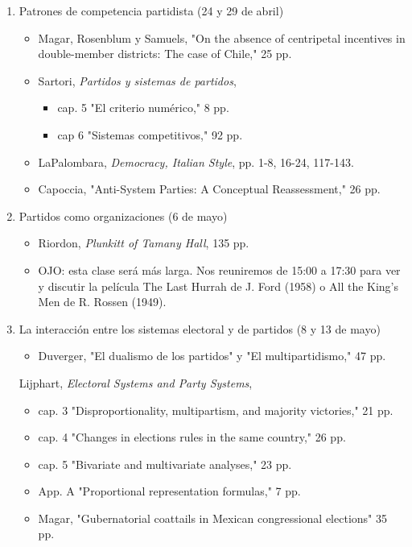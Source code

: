 \documentclass{article}
\begin{document}
\begin{enumerate}
\begin{itemize}
\end{itemize}
\item Patrones de competencia partidista  (24 y 29 de abril)
\label{sec:orgbbc7e78}
\begin{itemize}
\item Magar, Rosenblum y Samuels, "On the absence of centripetal incentives in double-member districts: The case of Chile," 25 pp.
\item Sartori, \emph{Partidos y sistemas de partidos}, 
\begin{itemize}
\item cap. 5 "El criterio numérico," 8 pp.
\item cap 6 "Sistemas competitivos," 92 pp.
\end{itemize}
\item LaPalombara, \emph{Democracy, Italian Style}, pp. 1-8, 16-24, 117-143.
\item Capoccia, "Anti-System Parties: A Conceptual Reassessment," 26 pp.
\end{itemize}
\item Partidos como organizaciones  (6 de mayo)
\label{sec:org40e676a}
\begin{itemize}
\item Riordon, \emph{Plunkitt of Tamany Hall}, 135 pp.
\item OJO: esta clase será más larga. Nos reuniremos de 15:00 a 17:30 para ver y discutir la película The Last Hurrah de J. Ford (1958) o All the King’s Men de R. Rossen (1949).
\end{itemize}
\item La interacción entre los sistemas electoral y de partidos  (8 y 13 de mayo)
\label{sec:orgb1caf6d}
\begin{itemize}
\item Duverger, "El dualismo de los partidos" y "El multipartidismo," 47 pp.
\end{itemize}
Lijphart, \emph{Electoral Systems and Party Systems}, 
\begin{itemize}
\item cap. 3 "Disproportionality, multipartism, and majority victories," 21 pp.
\item cap. 4 "Changes in elections rules in the same country," 26 pp.
\item cap. 5 "Bivariate and multivariate analyses," 23 pp.
\item App. A "Proportional representation formulas," 7 pp.
\end{itemize}
\begin{itemize}
\item Magar, "Gubernatorial coattails in Mexican congressional elections" 35 pp.
\end{itemize}
\end{enumerate}
\end{document}
